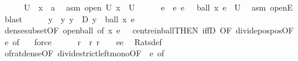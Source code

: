 \begin{isabellebody}
\ \ \ \ \isamarkupfalse%
\ U\ \ x\ {\isacharcolon}{\kern0pt}{\isacharcolon}{\kern0pt}\ {\isacharprime}{\kern0pt}a\ \isamarkupfalse%
\ asm{\isacharcolon}{\kern0pt}\ {\isachardoublequoteopen}open\ U{\isachardoublequoteclose}\ {\isachardoublequoteopen}x\ {\isasymin}\ U{\isachardoublequoteclose}\isanewline
\ \ \ \ \isamarkupfalse%
\ e\ \ e{\isacharcolon}{\kern0pt}\ {\isachardoublequoteopen}e\ {\isachargreater}{\kern0pt}\ {}{\isachardoublequoteclose}\ {\isachardoublequoteopen}ball\ x\ e\ {\isasymsubseteq}\ U{\isachardoublequoteclose}\ \isamarkupfalse%
\ asm\ openE\ \isamarkupfalse%
\ blast\isanewline
\ \ \ \ \isamarkupfalse%
\ y\ \ y{\isacharcolon}{\kern0pt}\ {\isachardoublequoteopen}y\ {\isasymin}\ D{\isachardoublequoteclose}\ {\isachardoublequoteopen}y\ {\isasymin}\ ball\ x\ {\isacharparenleft}{\kern0pt}e\ {\isacharslash}{\kern0pt}\ {}{\isacharparenright}{\kern0pt}{\isachardoublequoteclose}\ \isamarkupfalse%
\ dense{\isacharunderscore}{\kern0pt}subset{\isacharparenleft}{\kern0pt}{}{\isacharparenright}{\kern0pt}{\isacharbrackleft}{\kern0pt}OF\ open{\isacharunderscore}{\kern0pt}ball{\isacharcomma}{\kern0pt}\ of\ x\ {\isachardoublequoteopen}e\ {\isacharslash}{\kern0pt}\ {}{\isachardoublequoteclose}{\isacharbrackright}{\kern0pt}\ centre{\isacharunderscore}{\kern0pt}in{\isacharunderscore}{\kern0pt}ball{\isacharbrackleft}{\kern0pt}THEN\ iffD{}{\isacharcomma}{\kern0pt}\ OF\ divide{\isacharunderscore}{\kern0pt}pos{\isacharunderscore}{\kern0pt}pos{\isacharbrackleft}{\kern0pt}OF\ e{\isacharparenleft}{\kern0pt}{}{\isacharparenright}{\kern0pt}{\isacharcomma}{\kern0pt}\ of\ {}{\isacharbrackright}{\kern0pt}{\isacharbrackright}{\kern0pt}\ \isamarkupfalse%
\ force\isanewline
\ \ \ \ \isamarkupfalse%
\ r\ \ r{\isacharcolon}{\kern0pt}\ {\isachardoublequoteopen}r\ {\isasymin}\ {\isasymrat}\ {\isasyminter}\ {\isacharbraceleft}{\kern0pt}e{\isacharslash}{\kern0pt}{}{\isacharless}{\kern0pt}{\isachardot}{\kern0pt}{\isachardot}{\kern0pt}{\isacharless}{\kern0pt}e{\isacharslash}{\kern0pt}{}{\isacharbraceright}{\kern0pt}{\isachardoublequoteclose}\ \isamarkupfalse%
\ Rats{\isacharunderscore}{\kern0pt}def\ \isamarkupfalse%
\ of{\isacharunderscore}{\kern0pt}rat{\isacharunderscore}{\kern0pt}dense{\isacharbrackleft}{\kern0pt}OF\ divide{\isacharunderscore}{\kern0pt}strict{\isacharunderscore}{\kern0pt}left{\isacharunderscore}{\kern0pt}mono{\isacharbrackleft}{\kern0pt}OF\ {\isacharunderscore}{\kern0pt}\ e{\isacharparenleft}{\kern0pt}{}{\isacharparenright}{\kern0pt}{\isacharbrackright}{\kern0pt}{\isacharcomma}{\kern0pt}\ of\ {}\ {}{\isacharbrackright}{\kern0pt}\ \isamarkupfalse%

\end{isabellebody}
